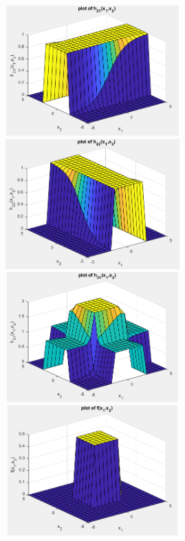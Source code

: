 \documentclass[solution,addpoints,12pt]{exam}
\begin{document}
\begin{questions}
\begin{parts}
\begin{solution}
                \includegraphics[width=7cm,height=5cm]{8}
                \includegraphics[width=7cm,height=5cm]{9}\\
                
                \includegraphics[width=7cm,height=5cm]{10}
                \includegraphics[width=7cm,height=5cm]{11}\\
                
            \end{solution}
                 
           \end{parts}
\end{questions}             
\end{document}

